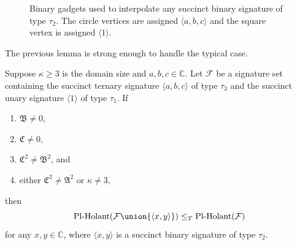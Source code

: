 \documentclass[11pt]{article}
\newcommand{\PlHolant}{\operatorname{Pl-Holant}}
\def\borderColor{blue!60}
\def\scale{0.6}
\def\nodeDist{1.4cm}
\begin{document}
\begin{figure}[t]
 \centering
 \subcaptionbox
 {\label{subfig:gadget:binary:unary}}{
  }
 \qquad
 \subcaptionbox
 {\label{subfig:gadget:binary:parallel_edges}}{
  }
 \caption{Binary gadgets used to interpolate any succinct binary signature of type $\tau_2$.
 The circle vertices are assigned $\langle a,b,c \rangle$ and the square vertex is assigned $\langle 1 \rangle$.}
 \label{fig:gadget:binary}
\end{figure}

The previous lemma is strong enough to handle the typical case.

\begin{lemma} \label{lem:binary:general}
 Suppose $\kappa \ge 3$ is the domain size and $a,b,c \in \mathbb{C}$.
 Let $\mathcal{F}$ be a signature set containing the succinct ternary signature $\langle a,b,c \rangle$ of type $\tau_3$
 and the succinct unary signature $\langle 1 \rangle$ of type $\tau_1$.
 If
 \begin{enumerate}
  \item $\mathfrak{B} \ne 0$,
  \item $\mathfrak{C} \ne 0$,
  \item $\mathfrak{C}^2 \ne \mathfrak{B}^2$, and
  \item either $\mathfrak{C}^2 \ne \mathfrak{A}^2$ or $\kappa \ne 3$,
 \end{enumerate}
 then
 \[
  \PlHolant(\mathcal{F} \union \{\langle x,y \rangle\}) \le_T \PlHolant(\mathcal{F})
 \]
 for any $x,y \in \mathbb{C}$,
 where $\langle x,y \rangle$ is a succinct binary signature of type $\tau_2$.
\end{lemma}
\end{document}
